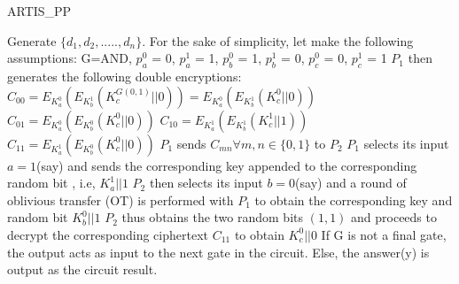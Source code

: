 \documentclass[12pt]{article}
\begin{document}
\begin{algorithm}[H]
\caption{ARTIS\_PP}
\begin{algorithmic}[1]
\State Generate $\{d_1,d_2,.....,d_n\}$.
\For
\newline {}
\State For the sake of simplicity, let make the following assumptions:
\newline  G=AND, $p_a^0$ = 0, $p_a^1$ = 1, $p_b^0$ = 1, $p_b^1$ = 0, $p_c^0$ = 0, $p_c^1$ = 1
\State $P_1$ then generates the following double encryptions:
\newline $C_{00} = E_{K_a^0}(E_{K_b^1}(K_c^{G(0,1)} || 0))= E_{K_a^0}(E_{K_b^1}(K_c^0 || 0))$
\newline $C_{01} = E_{K_a^0}(E_{K_b^0}(K_c^0 || 0))$
\newline $C_{10} = E_{K_a^1}(E_{K_b^1}(K_c^1 || 1))$
\newline $C_{11} = E_{K_a^1}(E_{K_b^0}(K_c^0 || 0))$
\State $P_1$ sends $C_{mn} \forall m,n \in \{0,1\}$  to $P_2$
\State $P_1$ selects its input $a=1$(say) and sends the corresponding key appended to the corresponding random bit , i.e, $K_a^1 || 1$
\State $P_2$ then selects its input $b=0$(say) and a round of oblivious transfer (OT) is performed with $P_1$ to obtain the corresponding key and random bit $K_b^0 || 1$
\State $P_2$ thus obtains the two random bits $(1,1)$ and proceeds to decrypt the corresponding ciphertext $C_{11}$ to obtain $K_c^0 || 0$
\State If G is not a final gate, the output acts as input to the next gate in the circuit. Else, the answer(y) is output as the circuit result.
\end{algorithmic}
\end{algorithm}
\end{document}
